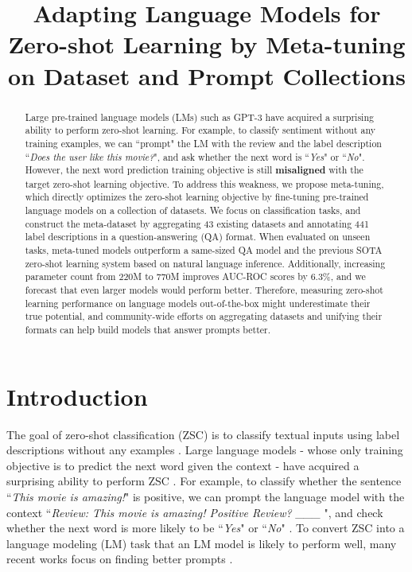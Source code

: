 \title{Adapting Language Models for Zero-shot Learning by Meta-tuning on Dataset and Prompt Collections}

\begin{abstract}
Large pre-trained language models (LMs) such as GPT-3 have acquired a surprising ability to perform zero-shot learning. For example, to classify sentiment without any training examples, we can ``prompt" the LM with the review and the label description ``\textit{Does the user like this movie?}", and ask whether the next word is ``\textit{Yes}" or ``\textit{No}".
However, the next word prediction training objective is still \textbf{misaligned} with the target zero-shot learning objective. To address this weakness, we propose meta-tuning, which directly optimizes the zero-shot learning objective by fine-tuning pre-trained language models on a collection of datasets. We focus on classification tasks, and construct the meta-dataset by aggregating 43 existing datasets and annotating 441 label descriptions in a question-answering (QA) format. When evaluated on unseen tasks, meta-tuned models outperform a same-sized QA model and the previous SOTA zero-shot learning system based on natural language inference. Additionally, increasing parameter count from 220M to 770M improves AUC-ROC scores by 6.3\%, and we forecast that even larger models would perform better. Therefore, measuring zero-shot learning performance on language models out-of-the-box might underestimate their true potential, and community-wide efforts on aggregating datasets and unifying their formats can help build models that answer prompts better.
\end{abstract}

\section{Introduction}

The goal of zero-shot classification (ZSC) is to classify textual inputs using label descriptions without any examples \cite{yin-etal-2019-benchmarking}. Large language models - whose only training objective is to predict the next word given the context - have acquired a surprising ability to perform ZSC \cite{radford2019language, brown2020language, le-scao-rush-2021-many}. For example, to classify whether the sentence ``\textit{This movie is amazing!}" is positive, we can prompt the language model with the context ``\textit{Review: This movie is amazing! Positive Review? \_\_\_ }", and check whether the next word is more likely to be ``\textit{Yes}" or ``\textit{No}" \cite{Zhao2021Calibrate}. To convert ZSC into a language modeling (LM) task that an LM model is likely to perform well, many recent works focus on finding better prompts \cite{shin-etal-2020-autoprompt, schick2020exploiting, schick2020s, gao-etal-2021-making}.

